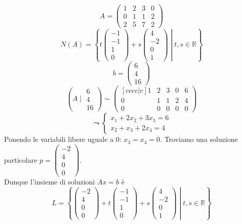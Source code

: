 \documentclass[12pt]{article}
\begin{document}
\[A = \begin{pmatrix}
    1 & 2 & 3 & 0\\
    0 & 1 & 1 & 2\\
    2 & 5 & 7 & 2
\end{pmatrix}\]
\[N(A) = \left\{\left. t \begin{pmatrix}
    -1\\
    -1\\
    1\\
    0
\end{pmatrix} + s\begin{pmatrix}
    4\\
    -2\\
    0\\
    1
\end{pmatrix} \; \right| \; t, s \in \mathbb{R} \right\}\]
\[b = \begin{pmatrix}
    6\\
    4\\
    16
\end{pmatrix}\]
\[\left(\left. A \; \right| \; \begin{matrix}
    6\\
    4\\
    16
\end{matrix}\right) \sim \begin{pmatrix}[cccc|c]
    1 & 2 & 3 & 0 & 6\\
    0 & 1 & 1 & 2 & 4\\
    0 & 0 & 0 & 0 & 0
\end{pmatrix}\]
\[\leadsto \begin{cases}
    x_1 + 2x_2 + 3x_3 = 6\\
    x_2 + x_3 + 2x_4 = 4
\end{cases}\]
Ponendo le variabili libere uguale a 0: $x_3 = x_4 = 0$. Troviamo una soluzione particolare $p = \begin{pmatrix}
    -2\\
    4\\
    0\\
    0
\end{pmatrix}$.\\
Dunque l'insieme di soluzioni $Ax = b$ è
\[L = \left\{\left. \begin{pmatrix}
    -2\\
    4\\
    0\\
    0
\end{pmatrix} + t \begin{pmatrix}
    -1\\
    -1\\
    1\\
    0
\end{pmatrix} + s \begin{pmatrix}
    4\\
    -2\\
    0\\
    1
\end{pmatrix} \; \right| \; t, s \in \mathbb{R}\right\}\]
\end{document}
